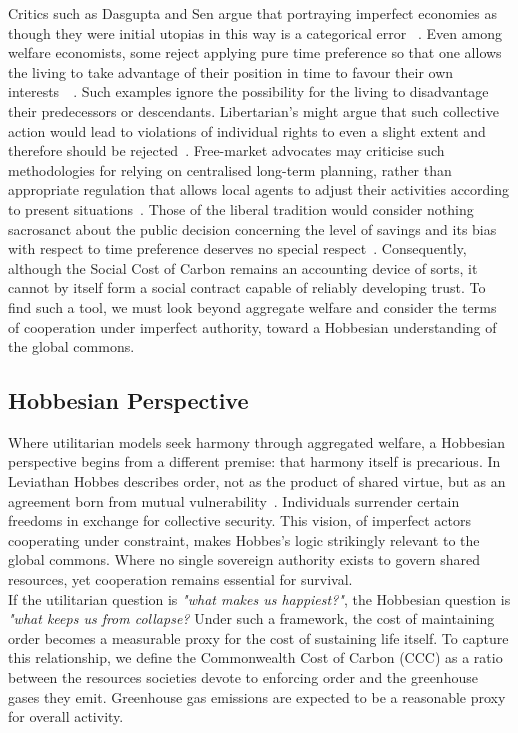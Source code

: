 \documentclass[12pt, oneside]{article}   	%
\begin{document}
Critics such as Dasgupta and Sen argue that portraying imperfect economies as though they were initial utopias in this way is a categorical error ~\cite{as1}.
Even among welfare economists, some reject applying pure time preference so that one allows the living to take advantage of their position in time to favour their own interests~\cite{hs1}~\cite{fr1}.
Such examples ignore the possibility for the living to disadvantage their predecessors or descendants.
Libertarian's might argue that such collective action would lead to violations of individual rights to even a slight extent and therefore should be rejected~\cite{rn1}.
Free-market advocates may criticise such methodologies for relying on centralised long-term planning, rather than appropriate regulation that allows local agents to adjust their activities according to present situations~\cite{fh1}.
Those of the liberal tradition would consider nothing sacrosanct about the public decision concerning the level of savings and its bias with respect to time preference deserves no special respect~\cite{jr1}.
Consequently, although the Social Cost of Carbon remains an accounting device of sorts, it cannot by itself form a social contract capable of reliably developing trust.
To find such a tool, we must look beyond aggregate welfare and consider the terms of cooperation under imperfect authority, toward a Hobbesian understanding of the global commons.\\

\subsection{Hobbesian Perspective}

Where utilitarian models seek harmony through aggregated welfare, a Hobbesian perspective begins from a different premise: that harmony itself is precarious.
In Leviathan Hobbes describes order, not as the product of shared virtue, but as an agreement born from mutual vulnerability~\cite{th1}.
Individuals surrender certain freedoms in exchange for collective security.
This vision, of imperfect actors cooperating under constraint, makes Hobbes’s logic strikingly relevant to the global commons.
Where no single sovereign authority exists to govern shared resources, yet cooperation remains essential for survival.\\

If the utilitarian question is \emph{"what makes us happiest?"}, the Hobbesian question is \emph{"what keeps us from collapse?}
Under such a framework, the cost of maintaining order becomes a measurable proxy for the cost of sustaining life itself.
To capture this relationship, we define the Commonwealth Cost of Carbon (CCC) as a ratio between the resources societies devote to enforcing order and the greenhouse gases they emit.
Greenhouse gas emissions are expected to be a reasonable proxy for overall activity.\\
\end{document}
